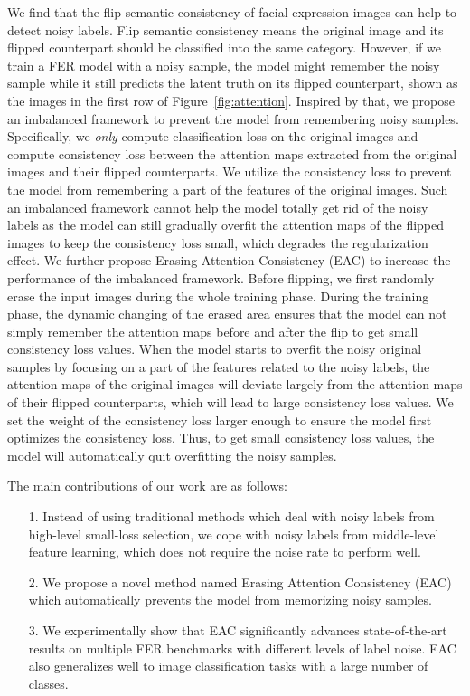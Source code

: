 \documentclass[runningheads]{llncs}
\begin{document}
We find that the flip semantic consistency of facial expression images can help to detect noisy labels. Flip semantic consistency means the original image and its flipped counterpart should be classified into the same category. However, if we train a FER model with a noisy sample, the model might remember the noisy sample while it still predicts the latent truth on its flipped counterpart, shown as the images in the first row of Figure~\ref{fig:attention}. Inspired by that, we propose an imbalanced framework to prevent the model from remembering noisy samples. Specifically, we \emph{only} compute classification loss on the original images and compute consistency loss between the attention maps extracted from the original images and their flipped counterparts. We utilize the consistency loss to prevent the model from remembering a part of the features of the original images. Such an imbalanced framework cannot help the model totally get rid of the noisy labels as the model can still gradually overfit the attention maps of the flipped images to keep the consistency loss small, which degrades the regularization effect. We further propose Erasing Attention Consistency (EAC) to increase the performance of the imbalanced framework. Before flipping, we first randomly erase the input images during the whole training phase. During the training phase, the dynamic changing of the erased area ensures that the model can not simply remember the attention maps before and after the flip to get small consistency loss values. When the model starts to overfit the noisy original samples by focusing on a part of the features related to the noisy labels, the attention maps of the original images will deviate largely from the attention maps of their flipped counterparts, which will lead to large consistency loss values. We set the weight of the consistency loss larger enough to ensure the model first optimizes the consistency loss. Thus, to get small consistency loss values, the model will automatically quit overfitting the noisy samples.

The main contributions of our work are as follows:

\begin{itemize}
\item[1.]Instead of using traditional methods which deal with noisy labels from high-level small-loss selection, we cope with noisy labels from middle-level feature learning, which does not require the noise rate to perform well.
\item[2.]We propose a novel method named Erasing Attention Consistency (EAC) which automatically prevents the model from memorizing noisy samples.
\item[3.]We experimentally show that EAC significantly advances state-of-the-art results on multiple FER benchmarks with different levels of label noise. EAC also generalizes well to image classification tasks with a large number of classes.
\end{itemize}
\end{document}
